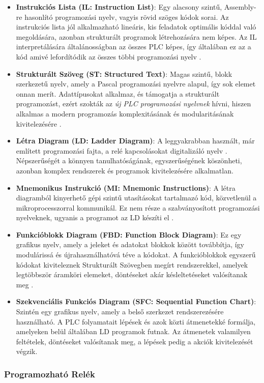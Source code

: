 \begin{itemize}
	\item \textbf{Instrukciós Lista (IL: Instruction List)}: Egy alacsony szintű, Assembly-re hasonlító programozási nyelv, vagyis rövid szöges kódok sorai. Az instrukciós lista jól alkalmazható lineáris, kis feladatok optimális kóddal való megoldására, azonban strukturált programok létrehozására nem képes. Az IL interpretálására általánosságban az összes PLC képes, így általában ez az a kód amivé lefordítódik az összes többi programozási nyelv \cite{Baresi1998}.
	\item \textbf{Strukturált Szöveg (ST: Structured Text)}: Magas szintű, blokk szerkezetű nyelv, amely a Pascal programozási nyelvre alapul, így sok elemet onnan merít. Adattípusokat alkalmaz, és támogatja a strukturált programozást, ezért szokták az \textit{új PLC programozási nyelvnek} hívni, hiszen alkalmas a modern programozás komplexitásának és modularitásának kivitelezésére \cite{Baresi1998}.
	\item \textbf{Létra Diagram (LD: Ladder Diagram)}: A leggyakrabban használt, már említett programozási fajta, a relé kapcsolásokat digitalizáló nyelv \cite{Dey2020}. Népszerűségét a könnyen tanulhatóságának, egyszerűségének köszönheti, azonban komplex rendszerek és programok kivitelezésére alkalmatlan.
	\item \textbf{Mnemonikus Instrukció (MI: Mnemonic Instructions)}: A létra diagramból kinyerhető gépi szintű utasításokat tartalmazó kód, közvetlenül a mikroprocesszorral kommunikál. Ez nem része a szabványosított programozási nyelveknek, ugyanis a programot az LD készíti el \cite{Dey2020}.
	\item \textbf{Funkcióblokk Diagram (FBD: Function Block Diagram)}: Ez egy grafikus nyelv, amely a jeleket és adatokat blokkok között továbbítja, így modulárissá és újrahasználhatóvá téve a kódokat. A funkcióblokkok egyszerű kódokat kiviteleznek Strukturált Szövegben megírt rendszerekkel, amelyek legtöbbször áramköri elemeket, döntéseket akár késleltetéseket valósítanak meg \cite{Baresi1998}.
	\item \textbf{Szekvenciális Funkciós Diagram (SFC: Sequential Function Chart)}: Szintén egy grafikus nyelv, amely a belső szerkezet rendszerezésére használható. A PLC folyamatait lépések és azok közti átmenetekké formálja, amelyeken belül általában LD programok futnak. Az átmenetek valamilyen feltételek, döntéseket valósítanak meg, a lépések pedig a akciók kivitelezését végzik.
\end{itemize}
\subsubsection{Programozható Relék}

